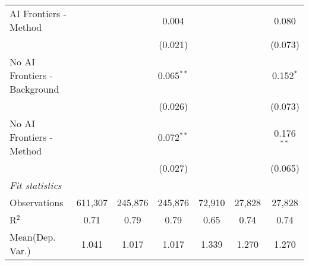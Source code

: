 \begin{tabular}{lcccccc}
   AI Frontiers - Method        &               &               & 0.004         &               &               & 0.080\\   
                                &               &               & (0.021)       &               &               & (0.073)\\   
   No AI Frontiers - Background &               &               & 0.065$^{**}$  &               &               & 0.152$^{*}$\\   
                                &               &               & (0.026)       &               &               & (0.073)\\   
   No AI Frontiers - Method     &               &               & 0.072$^{**}$  &               &               & 0.176$^{**}$\\   
                                &               &               & (0.027)       &               &               & (0.065)\\   
   \midrule
   \emph{Fit statistics}\\
   Observations                 & 611,307       & 245,876       & 245,876       & 72,910        & 27,828        & 27,828\\  
   R$^2$                        & 0.71          & 0.79          & 0.79          & 0.65          & 0.74          & 0.74\\  
Mean(Dep. Var.) & 1.041 & 1.017 & 1.017 & 1.339 & 1.270 & 1.270 \\
   

\end{tabular}
